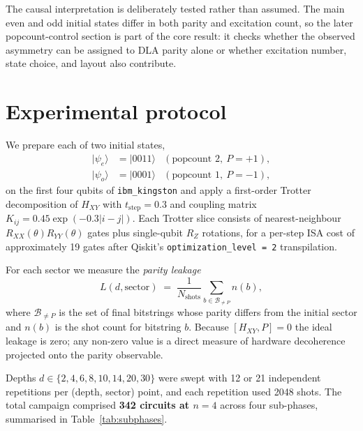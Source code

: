 \documentclass[reprint,aps,physrev,superscriptaddress,floatfix,longbibliography]{revtex4-2}
\begin{document}
The causal interpretation is deliberately tested rather than assumed.
The main even and odd initial states differ in both parity and
excitation count, so the later popcount-control section is part of the
core result: it checks whether the observed asymmetry can be assigned
to DLA parity alone or whether excitation number, state choice, and
layout also contribute.

\section{Experimental protocol}
\label{sec:protocol}

We prepare each of two initial states,
%
\begin{align}
  |\psi_e\rangle &= |0011\rangle & (\text{popcount } 2,\ P = +1), \\
  |\psi_o\rangle &= |0001\rangle & (\text{popcount } 1,\ P = -1),
\end{align}
%
on the first four qubits of \texttt{ibm\_kingston} and apply a
first-order Trotter decomposition of $H_{XY}$ with
$t_\text{step} = 0.3$ and coupling matrix
$K_{ij} = 0.45 \exp(-0.3 |i - j|)$. Each Trotter slice consists of
nearest-neighbour $R_{XX}(\theta) R_{YY}(\theta)$ gates plus
single-qubit $R_Z$ rotations, for a per-step ISA cost of
approximately 19 gates after Qiskit's \texttt{optimization\_level = 2}
transpilation.

For each sector we measure the \emph{parity leakage}
%
\begin{equation}\label{eq:leakage}
  L(d, \text{sector}) \;=\;
    \frac{1}{N_\text{shots}}
    \sum_{b \in \mathcal{B}_{\neq P}} n(b),
\end{equation}
%
where $\mathcal{B}_{\neq P}$ is the set of final bitstrings whose
parity differs from the initial sector and $n(b)$ is the shot count
for bitstring $b$. Because $[H_{XY}, P] = 0$ the ideal leakage is
zero; any non-zero value is a direct measure of hardware decoherence
projected onto the parity observable.

Depths $d \in \{2, 4, 6, 8, 10, 14, 20, 30\}$ were swept with
12 or 21 independent repetitions per (depth, sector) point, and each
repetition used 2048 shots. The total campaign comprised
\textbf{342 circuits at $n = 4$} across four sub-phases, summarised in
Table~\ref{tab:subphases}.
\end{document}
